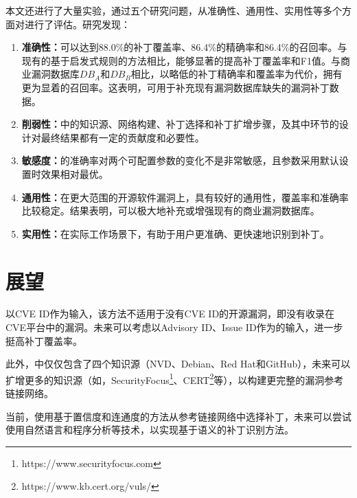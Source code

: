 本文还进行了大量实验，通过五个研究问题，从准确性、通用性、实用性等多个方面对\tool 进行了评估。研究发现：
\begin{enumerate}
    \item [（1）] \textbf{准确性：}\tool 可以达到88.0\%的补丁覆盖率、86.4\%的精确率和86.4\%的召回率。与现有的基于启发式规则的方法相比，\tool 能够显著的提高补丁覆盖率和F1值。与商业漏洞数据库$DB_A$和$DB_B$相比，\tool 以略低的补丁精确率和覆盖率为代价，拥有更为显着的召回率。这表明，\tool 可用于补充现有漏洞数据库缺失的漏洞补丁数据。
    \item [（2）] \textbf{削弱性：}\tool 中的知识源、网络构建、补丁选择和补丁扩增步骤，及其中环节的设计对最终结果都有一定的贡献度和必要性。
    \item [（3）] \textbf{敏感度：}\tool 的准确率对两个可配置参数的变化不是非常敏感，且参数采用默认设置时效果相对最优。
    \item [（4）] \textbf{通用性：}在更大范围的开源软件漏洞上，\tool 具有较好的通用性，覆盖率和准确率比较稳定。结果表明，\tool 可以极大地补充或增强现有的商业漏洞数据库。
    \item [（5）] \textbf{实用性：}在实际工作场景下，\tool 有助于用户更准确、更快速地识别到补丁。
\end{enumerate}


\section{展望}

\tool 以CVE ID作为输入，该方法不适用于没有CVE ID的开源漏洞，即没有收录在CVE平台中的漏洞。未来可以考虑以Advisory ID、Issue ID作为\tool 的输入，进一步挺高补丁覆盖率。

此外，\tool 中仅仅包含了四个知识源（NVD、Debian、Red Hat和GitHub），未来可以扩增更多的知识源（如，SecurityFocus\footnote{https://www.securityfocus.com}、CERT\footnote{https://www.kb.cert.org/vuls/}等），以构建更完整的漏洞参考链接网络。

当前，\tool 使用基于置信度和连通度的方法从参考链接网络中选择补丁，未来可以尝试使用自然语言和程序分析等技术，以实现基于语义的补丁识别方法。